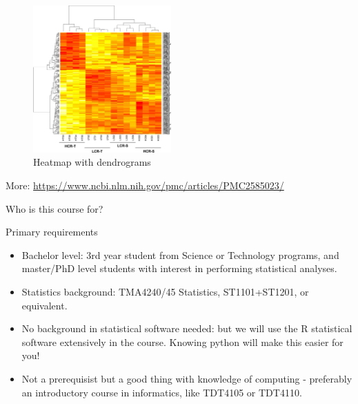 \documentclass[ignorenonframetext,]{beamer}
\begin{document}
\begin{frame}

\begin{figure}
\includegraphics[width=150pt]{heatmap} \caption{Heatmap with dendrograms}\label{fig:heatmap_pic}
\end{figure}

\tiny
More: \url{https://www.ncbi.nlm.nih.gov/pmc/articles/PMC2585023/}

\end{frame}

\begin{frame}{Who is this course for?}

\begin{block}{Primary requirements}

\begin{itemize}
\item
  Bachelor level: 3rd year student from Science or Technology programs,
  and master/PhD level students with interest in performing statistical
  analyses.
\item
  Statistics background: TMA4240/45 Statistics, ST1101+ST1201, or
  equivalent.
\item
  No background in statistical software needed: but we will use the R
  statistical software extensively in the course. Knowing python will
  make this easier for you!
\item
  Not a prerequisist but a good thing with knowledge of computing -
  preferably an introductory course in informatics, like TDT4105 or
  TDT4110.
\end{itemize}

\end{block}

\end{frame}
\end{document}
